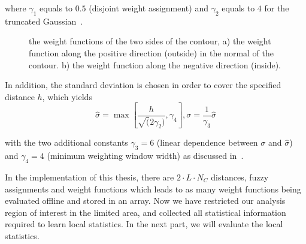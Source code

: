 where $\gamma_1$ equals to $0.5$ (disjoint weight assignment) and $\gamma_2$
equals to $4$ for the truncated Gaussian~\cite{hanek2004contracting}. 

\begin{figure} 
  \begin{minipage}[t]{0.45\linewidth} 
    \centering 
  \end{minipage}%
  \begin{minipage}[t]{0.45\linewidth} 
    \centering 
  \end{minipage} 
\caption{the weight functions of the two sides of the contour, a) the
  weight function along the positive direction (outside) in the normal of the
  contour. b) the weight function along the negative direction (inside). }
\label{fig:weight}
\end{figure}

In addition, the standard
deviation is chosen in order to cover the specified distance $h$,
which yields 
\begin{equation}
  \label{eq:deviation}
  \hat{\sigma} = \max \left[\frac{h}{\sqrt(2\gamma_2)}, \gamma_4
  \right], \sigma  = \frac{1}{\gamma_3} \hat{\sigma}
\end{equation}

with the two additional constants $\gamma_3 = 6$ (linear dependence
between $\sigma$ and $\hat{\sigma}$) and $\gamma_4 = 4$ (minimum
weighting window width) as discussed in~\cite{panin2006efficient}. 

In the implementation of this thesis,
there are $2 \cdot L \cdot N_C$ distances, fuzzy assignments
and weight functions which leads to as many weight functions being evaluated offline and stored in an array. Now we have restricted our analysis region of interest in the
limited area, and collected all statistical information required to learn
local statistics. In the next part, we will evaluate the local
statistics.

